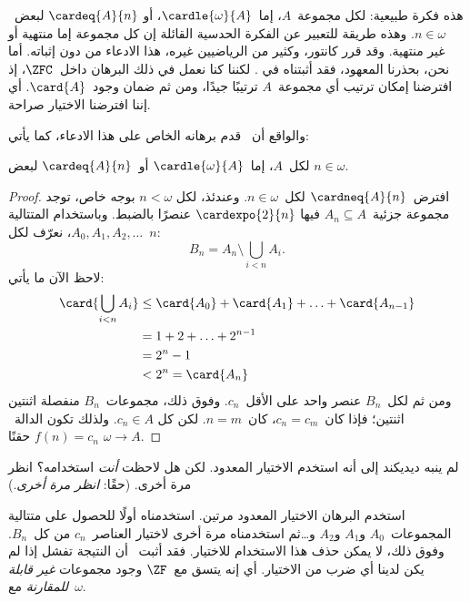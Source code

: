 \documentclass[../../../include/open-logic-section]{subfiles}
\begin{document}
\begin{ex}
هذه فكرة طبيعية: لكل مجموعة~$A$، إما~$\cardle{\omega}{A}$، أو
$\cardeq{A}{n}$ لبعض~$n \in \omega$. وهذه طريقة للتعبير عن الفكرة
الحدسية القائلة إن كل مجموعة إما منتهية أو غير منتهية. وقد قرر
كانتور، وكثير من الرياضيين غيره، هذا الادعاء من دون إثباته. أما نحن،
بحذرنا المعهود، فقد أثبتناه في
. لكننا كنا نعمل
في ذلك البرهان داخل~$\ZFC$، إذ افترضنا إمكان ترتيب أي مجموعة~$A$
ترتيبًا جيدًا، ومن ثم ضمان وجود~$\card{A}$. أي إننا افترضنا الاختيار
صراحة.

والواقع أن~\citet{Dedekind1888} قدم برهانه الخاص على هذا الادعاء، كما
يأتي:

\begin{thm}
لكل~$A$، إما~$\cardle{\omega}{A}$ أو~$\cardeq{A}{n}$ لبعض
$n \in \omega$.
\end{thm}

\begin{proof}
افترض~$\cardneq{A}{n}$ لكل~$n \in \omega$. وعندئذ، لكل
$n < \omega$ بوجه خاص، توجد مجموعة جزئية~$A_n \subseteq A$ فيها
$\cardexpo{2}{n}$ عنصرًا بالضبط. وباستخدام المتتالية
$A_0, A_1, A_2, \ldots$، نعرّف لكل~$n$:
\[
	B_n = A_n \setminus \bigcup_{i < n} A_i.
\]
لاحظ الآن ما يأتي:
\begin{align*}
	\card{\bigcup_{i < n}A_i}
	&\leq \card{A_0} + \card{A_1} + \ldots + \card{A_{n-1}}\\
	&=1 + 2 + \ldots + 2^{n-1}\\
	& = 2^n - 1\\
	& < 2^n = \card{A_n}
\end{align*}
ومن ثم لكل~$B_n$ عنصر واحد على الأقل~$c_n$. وفوق ذلك، مجموعات~$B_n$
منفصلة اثنتين اثنتين؛ فإذا كان~$c_n = c_m$، كان~$n = m$. لكن كل
$c_n \in A$. ولذلك تكون الدالة~$f(n) = c_n$ حقنًا
$\omega \to A$.
\end{proof}
\noindent
لم ينبه ديديكند إلى أنه استخدم الاختيار المعدود. لكن هل لاحظت
\emph{أنت} استخدامه؟ انظر مرة أخرى. (حقًا: \emph{انظر مرة أخرى}.)

استخدم البرهان الاختيار المعدود مرتين. استخدمناه أولًا للحصول على
متتالية المجموعات~$A_0$ و$A_1$ و$A_2$ و\dots\@ ثم استخدمناه مرة أخرى
لاختيار العناصر~$c_n$ من كل~$B_n$. وفوق ذلك، لا يمكن حذف هذا
الاستخدام للاختيار. فقد أثبت~\citet[p.~138]{Cohen1966} أن النتيجة
تفشل إذا لم يكن لدينا أي ضرب من الاختيار. أي إنه يتسق مع~$\ZF$ وجود
مجموعات \emph{غير قابلة للمقارنة} مع~$\omega$.
\end{ex}
\end{document}
